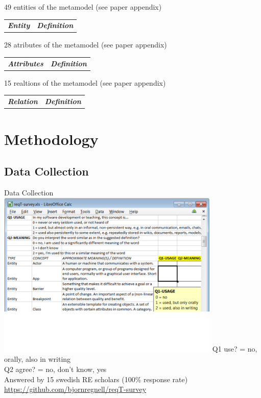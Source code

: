 \documentclass{slides}
\begin{document}
\begin{Slide}{49 entities of the metamodel (see paper appendix)}
\fontsize{3.5}{4.0}\selectfont
\begin{tabular}{l l}
\textbf{\textit{Entity}} & \textbf{\textit{Definition}}  \\

\end{tabular}
\end{Slide}

\begin{Slide}{28 atributes of the metamodel (see paper appendix)}
\fontsize{6}{6.5}\selectfont
\begin{tabular}{l l}
\textbf{\textit{Attributes}} & \textbf{\textit{Definition}}  \\

\end{tabular}
\end{Slide}


\begin{Slide}{15 realtions of the metamodel (see paper appendix)}
\fontsize{8}{9}\selectfont
\begin{tabular}{l l}
\textbf{\textit{Relation}} & \textbf{\textit{Definition}}  \\

\end{tabular}
\end{Slide}



\section{Methodology}
\subsection{Data Collection}
\begin{Slide}{Data Collection}
{\centering
\includegraphics[width=0.8\textwidth]{img/survey-screen-dump}
}
Q1 use? =   no, orally, also in writing\\
Q2 agree? = no, don't know, yes  \\
Answered by 15 swedish RE scholars (100\% response rate)\\
\url{https://github.com/bjornregnell/reqT-survey}


\end{Slide}
\end{document}
